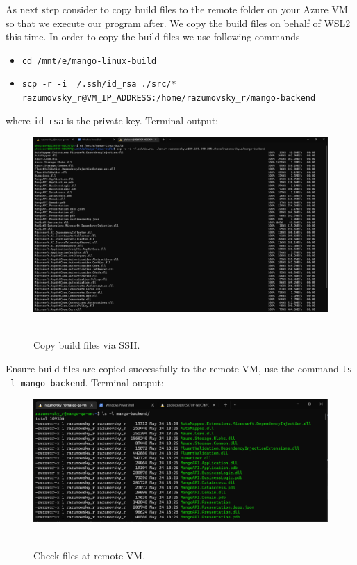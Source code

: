 As next step consider to copy build files to the remote folder on your Azure VM so that we execute our program after.
We copy the build files on behalf of WSL2 this time.
In order to copy the build files we use following commands
\begin{itemize}
    \item \texttt{cd /mnt/e/mango-linux-build}
    \item \texttt{scp -r -i ~/.ssh/id\_rsa ./src/* \\ razumovsky\_r@VM\_IP\_ADDRESS:/home/razumovsky\_r/mango-backend}
\end{itemize}
where \texttt{id\_rsa} is the private key.
Terminal output:
\begin{figure}[H]
    \centering
    \includegraphics[width=1\textwidth]{img/04_copy_build_files_via_ssh}
    ~\caption{Copy build files via SSH.}\label{fig:figure11}
\end{figure}
Ensure build files are copied successfully to the remote VM, use the command \texttt{ls -l mango-backend}.
Terminal output:
\begin{figure}[H]
    \centering
    \includegraphics[width=1\textwidth]{img/04_verify_files_on_remote_vm}
    ~\caption{Check files at remote VM.}\label{fig:figure12}
\end{figure}

